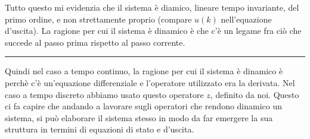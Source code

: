 Tutto questo mi evidenzia che il sistema è diamico, lineare tempo invariante, del primo ordine, e non strettamente proprio (compare $u(k)$ nell'equazione d'uscita).\newline
\newline
La ragione per cui il sistema è dinamico è che c'è un legame fra ciò che succede al passo prima rispetto al passo corrente.\newline
\rule{\textwidth}{0,4pt}\newline
\newline
Quindi nel caso a tempo continuo, la ragione per cui il sistema è dinamico è perchè c'è un'equazione differenziale e l'operatore utilizzato era la derivata. Nel caso a tempo discreto abbiamo usato questo operatore $z$, definito da noi.\newline
Questo ci fa capire che andando a lavorare sugli operatori che rendono dinamico un sistema, si può elaborare il sistema stesso in modo da far emergere la sua struttura in termini di equazioni di stato e d'uscita.\newline
\newline